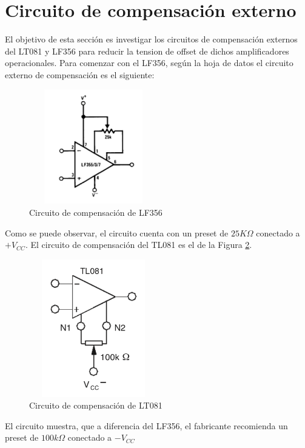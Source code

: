 \section{Circuito de compensación externo}
El objetivo de esta sección es investigar los circuitos de compensación externos del LT081 y LF356 para reducir la tension de offset de dichos amplificadores operacionales.
Para comenzar con el LF356, según la hoja de datos el circuito externo de compensación es el siguiente: 

\begin{figure}[ht]                                                       
    \centering\includegraphics[width=0.5\textwidth, height=5cm]{../Ex3/Figuras/fig_6.png}
     \caption{Circuito de compensación de LF356}
     \label{compensacion_LF356}
     \end{figure}

Como se puede observar, el circuito cuenta con un preset de $25K\Omega$ conectado a $+V_{CC}$. El circuito de compensación del TL081 es el 
de la Figura \ref{compensacion_LT081}.


\begin{figure}[h!]                                                       
    \centering\includegraphics[width=0.5\textwidth, height=6cm]{../Ex3/Figuras/fig_7.png}

    \caption{Circuito de compensación de LT081}
     \label{compensacion_LT081}
     \end{figure}

 
El circuito muestra, que a diferencia del LF356, el fabricante recomienda un preset de $100k\Omega$ conectado a $-V_{CC}$

